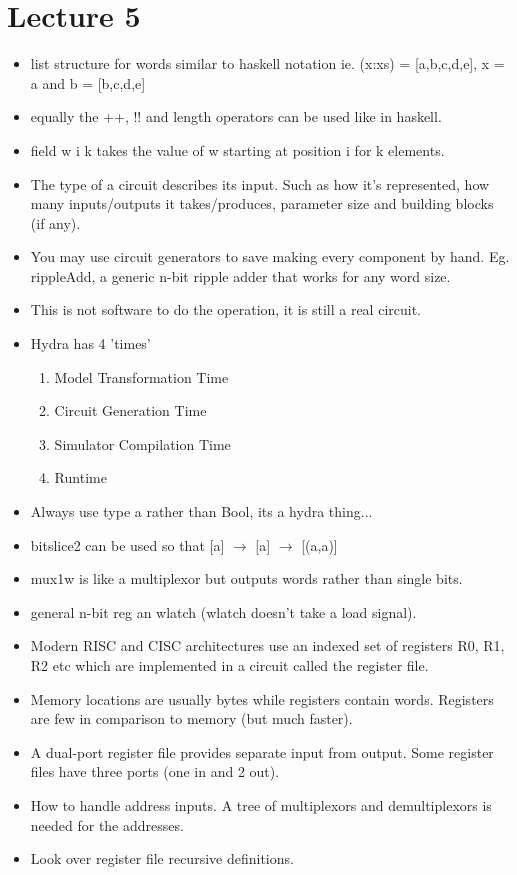\documentclass{article}
\begin{document}
\section*{Lecture 5}
\begin{itemize}
\item list structure for words similar to haskell notation ie. (x:xs) = [a,b,c,d,e], x = a and b = [b,c,d,e]
\item equally the ++, !! and length operators can be used like in haskell.
\item field w i k takes the value of w starting at position i for k elements.
\item The type of a circuit describes its input. Such as how it's represented, how many inputs/outputs it takes/produces, parameter size and building blocks (if any).
\item You may use circuit generators to save making every component by hand. Eg. rippleAdd, a generic n-bit ripple adder that works for any word size.
\item This is not software to do the operation, it is still a real circuit.
\item Hydra has 4 'times'
\begin{enumerate}
\item Model Transformation Time
\item Circuit Generation Time
\item Simulator Compilation Time
\item Runtime
\end{enumerate}
\item Always use type a rather than Bool, its a hydra thing...
\item bitslice2 can be used so that [a] $\rightarrow$ [a] $\rightarrow$ [(a,a)]
\item mux1w is like a multiplexor but outputs words rather than single bits.
\item general n-bit reg an wlatch (wlatch doesn't take a load signal).
\item Modern RISC and CISC architectures use an indexed set of registers R0, R1, R2 etc which are implemented in a circuit called the register file.
\item Memory locations are usually bytes while registers contain words. Registers are few in comparison to memory (but much faster).
\item A dual-port register file provides separate input from output. Some register files have three ports (one in and 2 out).
\item How to handle address inputs. A tree of multiplexors and demultiplexors is needed for the addresses.
\item Look over register file recursive definitions.
\end{itemize}
\end{document}
